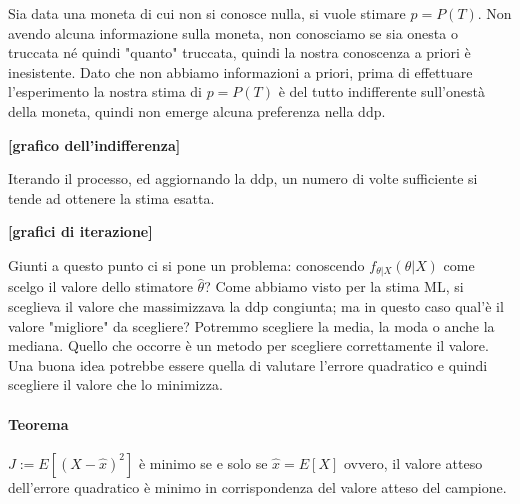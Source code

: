 \begin{esempio}
Sia data una moneta di cui non si conosce nulla, si vuole stimare $p=P(T)$.\newline
Non avendo alcuna informazione sulla moneta, non conosciamo se sia onesta o truccata né quindi "quanto" truccata, quindi la nostra conoscenza a priori è inesistente.\newline
Dato che non abbiamo informazioni a priori, prima di effettuare l'esperimento la nostra stima di $p=P(T)$ è del tutto indifferente sull'onestà della moneta, quindi non emerge alcuna preferenza nella ddp.

\begin{center}\textbf{[grafico dell'indifferenza]}\end{center}

Iterando il processo, ed aggiornando la ddp, un numero di volte sufficiente si tende ad ottenere la stima esatta.

\textbf{[grafici di iterazione]}
\end{esempio}

Giunti a questo punto ci si pone un problema: conoscendo $f_{\theta|X}(\theta|X)$ come scelgo il valore dello stimatore $\hat{\theta}$? Come abbiamo visto per la stima ML, si sceglieva il valore che massimizzava la ddp congiunta; ma in questo caso qual'è il valore "migliore" da scegliere? Potremmo scegliere la media, la moda o anche la mediana. Quello che occorre è un metodo per scegliere correttamente il valore.\newline
Una buona idea potrebbe essere quella di valutare l'errore quadratico e quindi scegliere il valore che lo minimizza.
\paragraph{Teorema} $J:=E[(X-\hat{x})^2]$ è minimo se e solo se $\hat{x}=E[X]$
ovvero, il valore atteso dell'errore quadratico è minimo in corrispondenza del valore atteso del campione.

